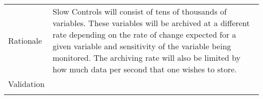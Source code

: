 \begin{longtable}{p{}p{}}
    Rationale &   Slow Controls will consist of tens of thousands of variables. These variables will be archived at a different rate depending on the rate of change expected for a given variable and sensitivity of the variable being monitored. The archiving rate will also be limited by how much data per second that one wishes to store.  \\ \colhline
    Validation &   \\
   \colhline


\end{longtable}
